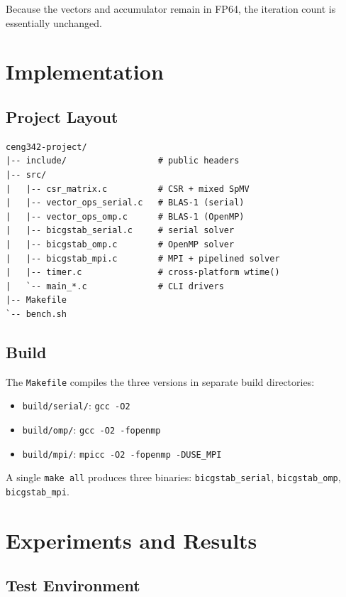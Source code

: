 \documentclass[11pt,a4paper]{article}
\begin{document}
Because the vectors and accumulator remain in FP64, the iteration
count is essentially unchanged.

\section{Implementation}

\subsection{Project Layout}

\begin{verbatim}
ceng342-project/
|-- include/                  # public headers
|-- src/
|   |-- csr_matrix.c          # CSR + mixed SpMV
|   |-- vector_ops_serial.c   # BLAS-1 (serial)
|   |-- vector_ops_omp.c      # BLAS-1 (OpenMP)
|   |-- bicgstab_serial.c     # serial solver
|   |-- bicgstab_omp.c        # OpenMP solver
|   |-- bicgstab_mpi.c        # MPI + pipelined solver
|   |-- timer.c               # cross-platform wtime()
|   `-- main_*.c              # CLI drivers
|-- Makefile
`-- bench.sh
\end{verbatim}

\subsection{Build}

The \texttt{Makefile} compiles the three versions in separate
build directories:
\begin{itemize}
    \item \texttt{build/serial/}: \texttt{gcc -O2}
    \item \texttt{build/omp/}: \texttt{gcc -O2 -fopenmp}
    \item \texttt{build/mpi/}: \texttt{mpicc -O2 -fopenmp -DUSE\_MPI}
\end{itemize}

\noindent A single \texttt{make all} produces three binaries:
\texttt{bicgstab\_serial}, \texttt{bicgstab\_omp},
\texttt{bicgstab\_mpi}.

\section{Experiments and Results}

\subsection{Test Environment}
\end{document}
